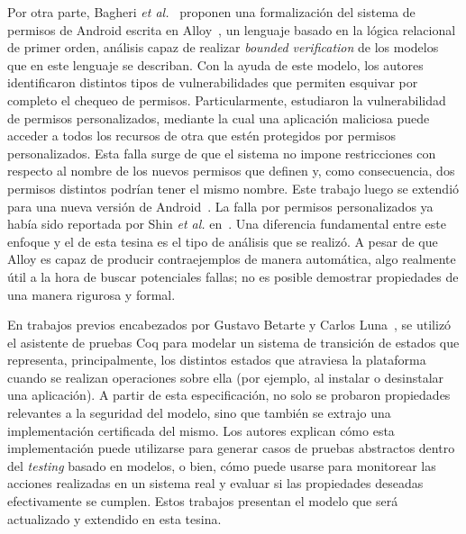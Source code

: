 Por otra parte, Bagheri \textit{et al.}~\cite{bagheri15} proponen una
formalización del sistema de permisos de Android escrita en Alloy~\cite{alloy},
un lenguaje basado en la lógica relacional de primer orden,
%
%
análisis capaz de realizar \textit{bounded verification} de los modelos que en
este lenguaje se describan. Con la ayuda de este modelo, los autores
identificaron distintos tipos de vulnerabilidades que permiten esquivar por
completo el chequeo de permisos. Particularmente, estudiaron la vulnerabilidad
de permisos personalizados, mediante la cual una aplicación maliciosa puede
acceder a todos los recursos de otra que estén protegidos por permisos
personalizados. Esta falla surge de que el sistema no impone restricciones con
respecto al nombre de los nuevos permisos que definen y, como consecuencia, dos
permisos distintos podrían tener el mismo nombre. Este trabajo luego se extendió
para una nueva versión de Android~\cite{bagheri}. La falla por permisos
personalizados ya había sido reportada por Shin \textit{et al.}
en~\cite{shin-custom}.
%
%
Una diferencia fundamental entre este enfoque y el de esta tesina es el tipo de
análisis que se realizó. A pesar de que Alloy es capaz de producir
contraejemplos de manera automática, algo realmente útil a la hora de buscar
potenciales fallas; no es posible demostrar propiedades de una manera rigurosa y
formal.

En trabajos previos encabezados por Gustavo Betarte y Carlos
Luna~\cite{betarte-2017, betarte-2016, luna-cleiej}, se utilizó el asistente de
%
%
pruebas Coq para modelar un sistema de transición de estados que representa,
principalmente, los distintos estados que atraviesa la plataforma cuando se
realizan operaciones sobre ella (por ejemplo, al instalar o desinstalar una
aplicación). A partir de esta especificación, no solo se probaron propiedades
relevantes a la seguridad del modelo, sino que también se extrajo una
implementación certificada del mismo. Los autores explican cómo esta
implementación puede utilizarse para generar casos de pruebas abstractos dentro
del \textit{testing} basado en modelos, o bien, cómo puede usarse para
monitorear las acciones realizadas en un sistema real y evaluar si las
propiedades deseadas efectivamente se cumplen. Estos trabajos presentan el
modelo que será actualizado y extendido en esta tesina.

